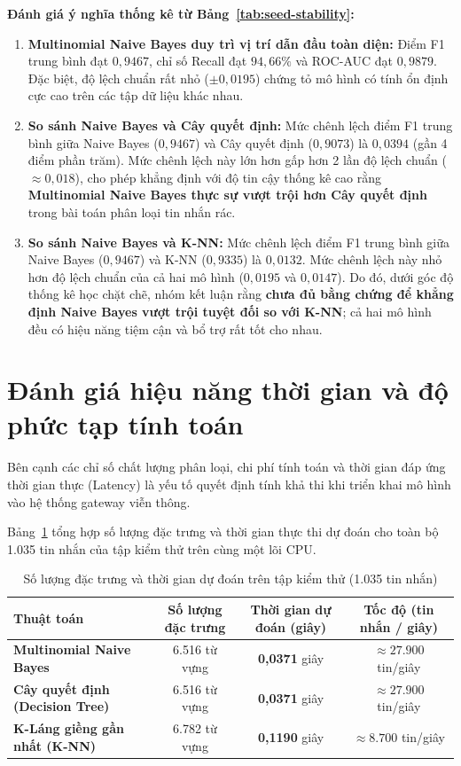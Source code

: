 \textbf{Đánh giá ý nghĩa thống kê từ Bảng~\ref{tab:seed-stability}:}
\begin{enumerate}
    \item \textbf{Multinomial Naive Bayes duy trì vị trí dẫn đầu toàn diện:} Điểm F1 trung bình đạt $0,9467$, chỉ số Recall đạt $94,66\%$ và ROC-AUC đạt $0,9879$. Đặc biệt, độ lệch chuẩn rất nhỏ ($\pm 0,0195$) chứng tỏ mô hình có tính ổn định cực cao trên các tập dữ liệu khác nhau.
    \item \textbf{So sánh Naive Bayes và Cây quyết định:} Mức chênh lệch điểm F1 trung bình giữa Naive Bayes ($0,9467$) và Cây quyết định ($0,9073$) là \textbf{$0,0394$} (gần 4 điểm phần trăm). Mức chênh lệch này lớn hơn gấp hơn 2 lần độ lệch chuẩn ($\approx 0,018$), cho phép khẳng định với độ tin cậy thống kê cao rằng \textbf{Multinomial Naive Bayes thực sự vượt trội hơn Cây quyết định} trong bài toán phân loại tin nhắn rác.
    \item \textbf{So sánh Naive Bayes và K-NN:} Mức chênh lệch điểm F1 trung bình giữa Naive Bayes ($0,9467$) và K-NN ($0,9335$) là \textbf{$0,0132$}. Mức chênh lệch này nhỏ hơn độ lệch chuẩn của cả hai mô hình ($0,0195$ và $0,0147$). Do đó, dưới góc độ thống kê học chặt chẽ, nhóm kết luận rằng \textbf{chưa đủ bằng chứng để khẳng định Naive Bayes vượt trội tuyệt đối so với K-NN}; cả hai mô hình đều có hiệu năng tiệm cận và bổ trợ rất tốt cho nhau.
\end{enumerate}

\section{Đánh giá hiệu năng thời gian và độ phức tạp tính toán}
\label{sec:hieu-nang-thoi-gian}

Bên cạnh các chỉ số chất lượng phân loại, chi phí tính toán và thời gian đáp ứng thời gian thực (Latency) là yếu tố quyết định tính khả thi khi triển khai mô hình vào hệ thống gateway viễn thông.

Bảng~\ref{tab:thoi-gian-tinh-toan} tổng hợp số lượng đặc trưng và thời gian thực thi dự đoán cho toàn bộ 1.035 tin nhắn của tập kiểm thử trên cùng một lõi CPU.

\begin{table}[H]
\centering
\caption{Số lượng đặc trưng và thời gian dự đoán trên tập kiểm thử (1.035 tin nhắn)}
\label{tab:thoi-gian-tinh-toan}
\begin{tabular}{|l|c|c|c|}
\hline
\textbf{Thuật toán} & \textbf{Số lượng đặc trưng} & \textbf{Thời gian dự đoán (giây)} & \textbf{Tốc độ (tin nhắn / giây)} \\
\hline
\textbf{Multinomial Naive Bayes} & 6.516 từ vựng & \textbf{0,0371} giây & $\approx 27.900$ tin/giây \\
\hline
\textbf{Cây quyết định (Decision Tree)} & 6.516 từ vựng & \textbf{0,0371} giây & $\approx 27.900$ tin/giây \\
\hline
\textbf{K-Láng giềng gần nhất (K-NN)} & 6.782 từ vựng & \textbf{0,1190} giây & $\approx 8.700$ tin/giây \\
\hline
\end{tabular}
\end{table}

